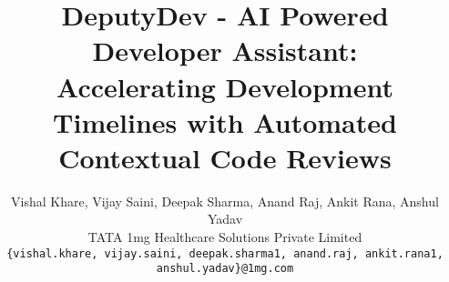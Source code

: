 \documentclass[twocolumn]{article}
\title{\textbf{DeputyDev - AI Powered Developer Assistant:\\
Accelerating Development Timelines with Automated Contextual Code Reviews}}
\author{Vishal Khare, Vijay Saini, Deepak Sharma, Anand Raj, Ankit Rana, Anshul Yadav\\
TATA 1mg Healthcare Solutions Private Limited\\
{\tt\small \{vishal.khare, vijay.saini, deepak.sharma1, anand.raj, ankit.rana1, anshul.yadav\}@1mg.com}
}
\date{}
\begin{document}
\maketitle


























{\small


}

\clearpage


\end{document}
